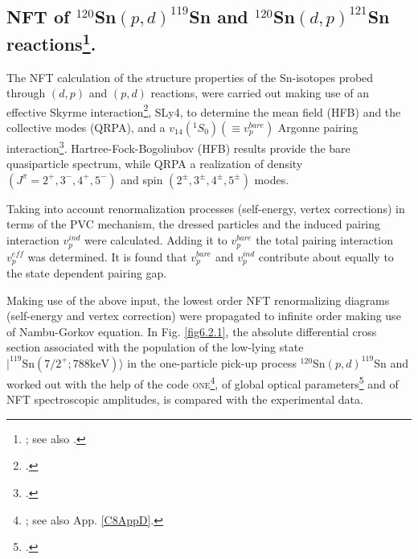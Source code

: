     \subsection{NFT of $^{120}$Sn$(p,d)^{119}$Sn and $^{120}$Sn$(d,p)^{121}$Sn reactions\protect\footnote{\cite{Idini:15}; see also \cite{Idini:13}.}.}\label{C6S2.1}
  The NFT calculation of the structure properties of the Sn-isotopes probed through $(d,p)$ and $(p,d)$ reactions, were carried out making use of an effective Skyrme interaction\footnote{\cite{Chabanat:97}.}, SLy4, to determine the mean field (HFB) and the collective modes (QRPA), and a $v_{14}(^1S_0)(\equiv v_p^{bare})$ Argonne pairing interaction\footnote{\cite{Wiringa:84}.}. Hartree-Fock-Bogoliubov (HFB) results provide the bare quasiparticle spectrum, while QRPA a realization of density $(J^\pi=2^+,3^-,4^+,5^-)$ and spin $(2^\pm,3^\pm,4^\pm,5^\pm)$ modes.
  
  Taking into account renormalization processes (self-energy, vertex corrections) in terms of the PVC mechanism, the dressed particles and the induced pairing interaction $v_{p}^{ind}$ were calculated. Adding it to $v^{bare}_p$  the total pairing interaction $v_p^{eff}$ was determined. It is found that $v_p^{bare}$ and $v_p^{ind}$ contribute about equally to the state dependent pairing gap.
  
  Making use of the above input, the lowest order NFT renormalizing diagrams (self-energy and vertex correction) were propagated to infinite order making use of Nambu-Gorkov equation.
  In Fig. \ref{fig6.2.1}, the absolute differential cross section associated with the population of the low-lying state $|^{119}\text{Sn}(7/2^+;788 \text{keV})\rangle$ in the one-particle pick-up process $^{120}$Sn$(p,d)^{119}$Sn and  worked out with the help of the code \textsc{one}\footnote{\cite{Potel:12b}; see also App. \ref{C8AppD}.}, of global optical parameters\footnote{\cite{Dickey:82}.} and of NFT spectroscopic amplitudes, is compared with the experimental data.     
  
